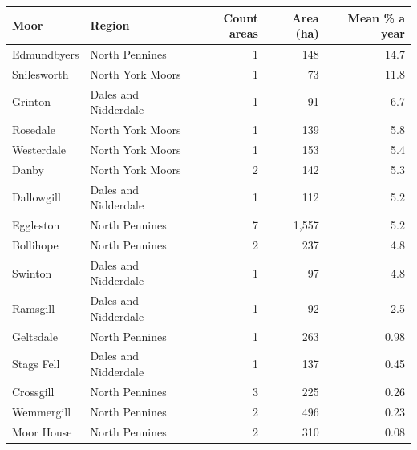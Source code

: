 \begin{tabular}{llrrr}
\toprule
Moor & Region & Count areas & Area (ha) & Mean \% a year \\
\midrule
Edmundbyers & North Pennines & 1 & 148 & 14.7 \\
Snilesworth & North York Moors & 1 & 73 & 11.8 \\
Grinton & Dales and Nidderdale & 1 & 91 & 6.7 \\
Rosedale & North York Moors & 1 & 139 & 5.8 \\
Westerdale & North York Moors & 1 & 153 & 5.4 \\
Danby & North York Moors & 2 & 142 & 5.3 \\
Dallowgill & Dales and Nidderdale & 1 & 112 & 5.2 \\
Eggleston & North Pennines & 7 & 1,557 & 5.2 \\
Bollihope & North Pennines & 2 & 237 & 4.8 \\
Swinton & Dales and Nidderdale & 1 & 97 & 4.8 \\
Ramsgill & Dales and Nidderdale & 1 & 92 & 2.5 \\
Geltsdale & North Pennines & 1 & 263 & 0.98 \\
Stags Fell & Dales and Nidderdale & 1 & 137 & 0.45 \\
Crossgill & North Pennines & 3 & 225 & 0.26 \\
Wemmergill & North Pennines & 2 & 496 & 0.23 \\
Moor House & North Pennines & 2 & 310 & 0.08 \\
\bottomrule
\end{tabular}
